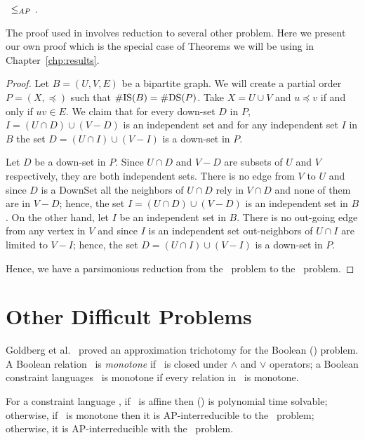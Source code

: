 \begin{lemma} \label{lem:bistods}
\cbis\ \(\le_{AP}\) \cdsp\@.
\end{lemma}

The proof used in \cite{counting} involves reduction to several other problem. Here 
we present our own proof which is the special case of Theorems we will be using in
Chapter~\ref{chp:results}\@.

\begin{proof}
Let \(B=(U,V,E)\) be a bipartite graph. We will create a partial order \(P=(X,\preceq)\)
such that \(\#\mathrm{IS}(B)=\#\mathrm{DS}(P)\)\@. Take \(X=U \cup V\) and \(u \preceq v\) if and only if
\(uv \in E\)\@. We claim that for every down-set \(D\) in \(P\), 
\(I=(U\cap D) \cup (V - D)\) is an independent set and for any independent set
\(I\) in \(B\) the set \(D=(U \cap I) \cup (V - I)\) is a down-set in \(P\)\@.

Let \(D\) be a down-set in \(P\)\@. Since \(U\cap D\) and \(V - D\) are subsets of
\(U\) and \(V\) respectively, they are both independent sets.
There is no edge from \(V\) to \(U\) and since \(D\) is a DownSet
all the neighbors of \(U\cap D\) rely in \(V\cap D\)
and none of them are in \(V - D\); hence, the set \(I=(U\cap D) \cup (V - D)\) is
an independent set in \(B\)\@. On the other hand, let \(I\) be an independent set in \(B\)\@.
There is no out-going edge from any vertex in \(V\) and since \(I\) is an independent set
out-neighbors of \(U\cap I\) are limited to \(V - I\); hence, the set \(D=(U \cap I) \cup (V - I)\) is
a down-set in \(P\)\@.

Hence, we have a parsimonious reduction from the \cbis\ problem to the \cdsp\ problem.
\end{proof}

\section{Other Difficult Problems} \label{sec:other}
Goldberg et al.~\cite{Trichotomy} proved an approximation trichotomy for the Boolean
\ccsp(\mrelset) problem. A Boolean relation \mR\ is \emph{monotone} if \mR\ is closed under
\(\land\) and \(\lor\) operators; a Boolean constraint languages \mrelset\ is monotone if 
every relation in \mrelset\ is monotone.


\begin{theorem} \label{thrm:trichotomy}
For a constraint language \mrelset,
if \mrelset\ is affine then \ccsp(\mrelset) is polynomial time solvable; otherwise,
if \mrelset\ is monotone then it is AP-interreducible to the \cbis\ problem; otherwise,
it is AP-interreducible with the \csat\ problem.
\end{theorem}

